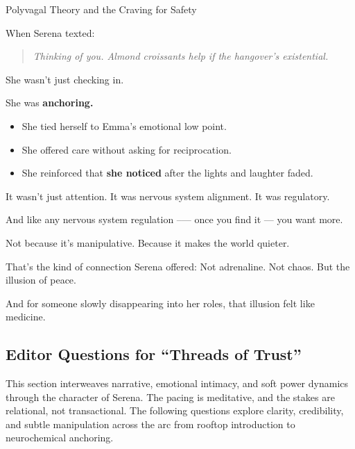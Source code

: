 \begin{PsychologicalSidebar}{Polyvagal Theory and the Craving for Safety}
    \medskip

    When Serena texted:

    \begin{quote}
    \textit{Thinking of you. Almond croissants help if the hangover’s existential.}
    \end{quote}

    She wasn’t just checking in.

    \medskip
    

    She was \textbf{anchoring.}

    \medskip
    

    \begin{itemize}
    \item She tied herself to Emma’s emotional low point.
    \item She offered care without asking for reciprocation.
    \item She reinforced that \textbf{she noticed} after the lights and laughter faded.
    \end{itemize}

    \medskip
    
    It wasn’t just attention.  
    It was nervous system alignment.
    It was regulatory.
    
    \medskip
    
    And like any nervous system regulation --— once you find it --- you want more.

    \medskip
    
    Not because it’s manipulative.  
    Because it makes the world quieter.
    
    \medskip
    
    That’s the kind of connection Serena offered:  
    Not adrenaline. Not chaos.  
    But the illusion of peace.

    \medskip
    
    And for someone slowly disappearing into her roles,  
    that illusion felt like medicine.

\end{PsychologicalSidebar}


\subsection*{Editor Questions for ``Threads of Trust''}

This section interweaves narrative, emotional intimacy, and soft power dynamics through the character of Serena. The pacing is meditative, and the stakes are relational, not transactional. The following questions explore clarity, credibility, and subtle manipulation across the arc from rooftop introduction to neurochemical anchoring.

